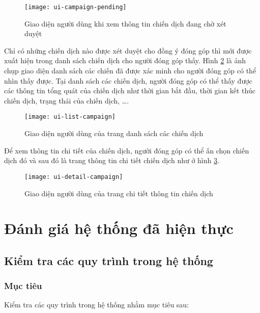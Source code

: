 \documentclass[../main-report.tex]{subfiles}
\begin{document}
\begin{figure}[ht!]
\begin{center}
\label{fig:ui-campaign-pending}
\texttt{[image: ui-campaign-pending]}
\caption{Giao diện người dùng khi xem thông tin chiến dịch đang chờ xét duyệt}
\end{center}
\end{figure}

Chỉ có những chiến dịch nào được xét duyệt cho đồng ý đóng góp thì mới được xuất hiện trong danh sách chiến dịch cho người đóng góp thấy. Hình \ref{fig:ui-list-campaign} là ảnh chụp giao diện danh sách các chiến đã được xác minh cho người đóng góp có thể nhìn thấy được. Tại danh sách các chiến dịch, người đóng góp có thể thấy được các thông tin tổng quát của chiến dịch như thời gian bắt đầu, thời gian kết thúc chiến dịch, trạng thái của chiến dịch, \ldots.

\begin{figure}[ht!]
\begin{center}
\label{fig:ui-list-campaign}
\texttt{[image: ui-list-campaign]}
\caption{Giao diện người dùng của trang danh sách các chiến dịch}
\end{center}
\end{figure}

Để xem thông tin chi tiết của chiến dịch, người đóng góp có thể ấn chọn chiến dịch đó và sau đó là trang thông tin chi tiết chiến dịch như ở hình \ref{fig:ui-detail-campaign}.

\begin{figure}[ht!]
\begin{center}
\label{fig:ui-detail-campaign}
\texttt{[image: ui-detail-campaign]}
\caption{Giao diện người dùng của trang chi tiết thông tin chiến dịch}
\end{center}
\end{figure}

\section{Đánh giá hệ thống đã hiện thực}
\subsection{Kiểm tra các quy trình trong hệ thống}
\subsubsection{Mục tiêu}
Kiểm tra các quy trình trong hệ thống nhằm mục tiêu sau:
\end{document}
